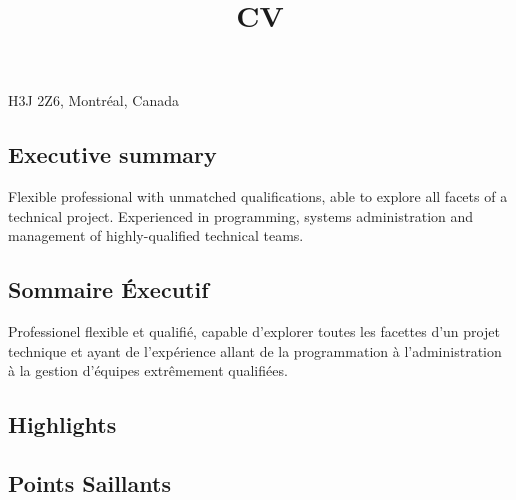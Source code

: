 \title{CV}
\address{151 Atwater, CP 72107}{H3J 2Z6, Montr\'{e}al, Canada}



\makecvtitle

\begin{langen}
\section{Executive summary}
Flexible professional with unmatched qualifications, able to explore all facets of a technical project. Experienced in programming, systems administration and management of highly-qualified technical teams.
\end{langen}

\begin{langfr}
\section{Sommaire \'{E}xecutif}
Professionel flexible et qualifi\'{e}, capable d'explorer toutes les facettes d'un projet technique et ayant de l'exp\'{e}rience allant de la programmation \`{a} l'administration \`{a} la gestion d'\'{e}quipes extr\^{e}mement qualifi\'{e}es.
\end{langfr}

\begin{langen}
\section{Highlights}
\end{langen}
\begin{langfr}
\section{Points Saillants}
\end{langfr}

